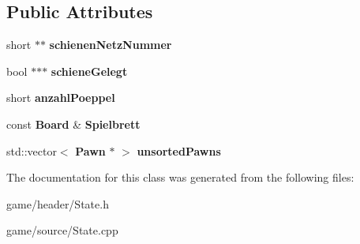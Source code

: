 \subsection*{Public Attributes}
\begin{DoxyCompactItemize}
\item 
short $\ast$$\ast$ {\bfseries schienen\-Netz\-Nummer}\label{class_state_aa596bf79a270efaacec2cdcc523c29cb}

\item 
bool $\ast$$\ast$$\ast$ {\bfseries schiene\-Gelegt}\label{class_state_a48273ba0bf0d613435726e39853c90d2}

\item 
short {\bfseries anzahl\-Poeppel}\label{class_state_a109a342df5b9c753c90e52d845581cfb}

\item 
const {\bf Board} \& {\bfseries Spielbrett}\label{class_state_ab70a887fdd766c1bf7e1605a97ce592a}

\item 
std\-::vector$<$ {\bf Pawn} $\ast$ $>$ {\bfseries unsorted\-Pawns}\label{class_state_af75d24cbceb25a2cb35f6416bdc374eb}

\end{DoxyCompactItemize}


The documentation for this class was generated from the following files\-:\begin{DoxyCompactItemize}
\item 
game/header/State.\-h\item 
game/source/State.\-cpp\end{DoxyCompactItemize}
